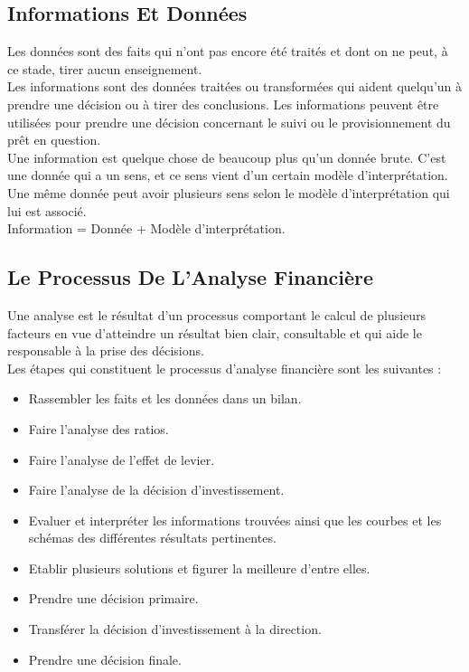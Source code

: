 \documentclass[a4paper,10pt]{article}
\begin{document}
\subsection{Informations Et Données}
Les données sont des faits qui n'ont pas encore été traités et dont on ne peut, à ce stade, tirer aucun enseignement.  \\
Les informations sont des données traitées ou transformées qui aident quelqu'un à prendre une décision ou à tirer des conclusions. Les informations peuvent être utilisées pour prendre une décision concernant le suivi ou le provisionnement du prêt en question.\\
Une information est quelque chose de beaucoup plus qu'un donnée brute. C'est une donnée qui a un sens, et ce sens vient d'un certain modèle d'interprétation. Une même donnée peut avoir plusieurs sens selon le modèle d'interprétation qui lui est associé.\\
Information = Donnée + Modèle d'interprétation.

\subsection{Le Processus De L'Analyse Financière}
Une analyse est le résultat d'un processus comportant le calcul de plusieurs facteurs en vue d'atteindre un résultat bien clair, consultable et qui aide le responsable à la prise des décisions.\\
 Les étapes qui constituent le processus d’analyse financière sont les suivantes :\\
 \begin{itemize}
 
\item Rassembler les faits et les données dans un bilan.
\item Faire l’analyse des ratios.
\item Faire l’analyse de l’effet de levier.
\item Faire l’analyse de la décision d’investissement.
\item Evaluer et interpréter les informations trouvées ainsi que les courbes et les schémas des différentes résultats pertinentes.
\item Etablir plusieurs solutions et figurer la meilleure d’entre elles.
\item Prendre une décision primaire.
\item Transférer la décision d’investissement à la direction.
\item Prendre une décision finale.

 \end{itemize}
\end{document}

